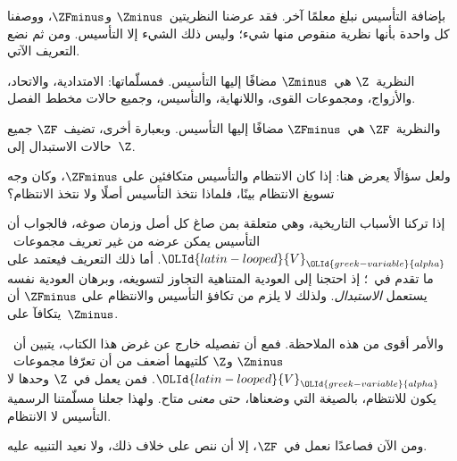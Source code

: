\documentclass[../../../include/open-logic-section]{subfiles}
\begin{document}

بإضافة التأسيس نبلغ معلمًا آخر. فقد عرضنا النظريتين~$\Zminus$
و$\ZFminus$، ووصفنا كل واحدة بأنها نظرية منقوص منها شيء؛ وليس ذلك
الشيء إلا التأسيس. ومن ثم نضع التعريف الآتي.

\begin{defn}
النظرية~$\Z$ هي~$\Zminus$ مضافًا إليها التأسيس. فمسلّماتها:
الامتدادية، والاتحاد، والأزواج، ومجموعات القوى، واللانهاية، والتأسيس،
وجميع حالات مخطط الفصل.

والنظرية~$\ZF$ هي~$\ZFminus$ مضافًا إليها التأسيس. وبعبارة أخرى،
تضيف~$\ZF$ جميع حالات الاستبدال إلى~$\Z$.
\end{defn}

ولعل سؤالًا يعرض هنا: إذا كان الانتظام والتأسيس متكافئين على
$\ZFminus$، وكان وجه تسويغ الانتظام بينًا، فلماذا نتخذ التأسيس أصلًا
ولا نتخذ الانتظام؟

إذا تركنا الأسباب التاريخية، وهي متعلقة بمن صاغ كل أصل وزمان صوغه،
فالجواب أن التأسيس يمكن عرضه من غير تعريف مجموعات~${\OLId{latin-looped}{V}}_{\OLId{greek-variable}{alpha}}$. أما ذلك
التعريف فيعتمد على ما تقدم في~؛ إذ احتجنا إلى
العودية المتناهية التجاوز لتسويغه، وبرهان العودية نفسه يستعمل
\emph{الاستبدال}. ولذلك لا يلزم من تكافؤ التأسيس والانتظام على
$\ZFminus$ أن يتكافآ على~$\Zminus$.

والأمر أقوى من هذه الملاحظة. فمع أن تفصيله خارج عن غرض هذا الكتاب،
يتبين أن~$\Zminus$ و$\Z$ كلتيهما أضعف من أن تعرّفا مجموعات~${\OLId{latin-looped}{V}}_{\OLId{greek-variable}{alpha}}$.
فمن يعمل في~$\Z$ وحدها لا يكون للانتظام، بالصيغة التي وضعناها، حتى
\emph{معنى} متاح. ولهذا جعلنا مسلّمتنا الرسمية التأسيس لا الانتظام.

ومن الآن فصاعدًا نعمل في~$\ZF$، إلا أن ننص على خلاف ذلك، ولا نعيد
التنبيه عليه.
\end{document}
